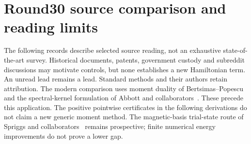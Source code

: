 \section{Round30 source comparison and reading limits}
\label{sec:r30-sources}
The following records describe selected source reading, not an exhaustive state-of-the-art survey. Historical documents, patents, government custody and subreddit discussions may motivate controls, but none establishes a new Hamiltonian term. An unread lead remains a lead. Standard methods and their authors retain attribution.
The modern comparison uses moment duality of Bertsimas--Popescu~\citep{bertsimas2005moments} and the spectral-kernel formulation of Abbott and collaborators~\citep{abbott2026causal}. These precede this application. The positive pointwise certificates in the following derivations do not claim a new generic moment method. The magnetic-basis trial-state route of Spriggs and collaborators~\citep{spriggs2025su2} remains prospective; finite numerical energy improvements do not prove a lower gap.
\begingroup\footnotesize\setlength{\tabcolsep}{4pt}
